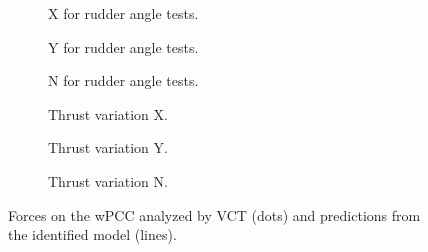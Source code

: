 \begin{figure}[H]
    \vfill
     \begin{subfigure}[b]{0.32\textwidth}
         \centering
         
        \caption{X for rudder angle tests.}
        \label{fig:rudder_angle_X_wPCC}
     \end{subfigure}
     \hfill
     \begin{subfigure}[b]{0.32\textwidth}
         \centering
         
        \caption{Y for rudder angle tests.}
        \label{fig:rudder_angle_Y_wPCC}
     \end{subfigure}
     \hfill
     \begin{subfigure}[b]{0.32\textwidth}
         \centering
         
        \caption{N for rudder angle tests.}
        \label{fig:rudder_angle_N_wPCC}
     \end{subfigure}

     \vfill
     \begin{subfigure}[b]{0.32\textwidth}
         \centering
         
        \caption{Thrust variation X.}
        \label{fig:Thrust variation_X_wPCC}
     \end{subfigure}
     \hfill
     \begin{subfigure}[b]{0.32\textwidth}
         \centering
         
        \caption{Thrust variation Y.}
        \label{fig:Thrust variation_Y_wPCC}
     \end{subfigure}
     \hfill
     \begin{subfigure}[b]{0.32\textwidth}
         \centering
         
        \caption{Thrust variation N.}
        \label{fig:Thrust variation_N_wPCC}
     \end{subfigure}
     
    \caption{Forces on the wPCC analyzed by VCT (dots) and predictions from the identified model (lines).}
    \label{fig:VCT_wPCC}
\end{figure}

